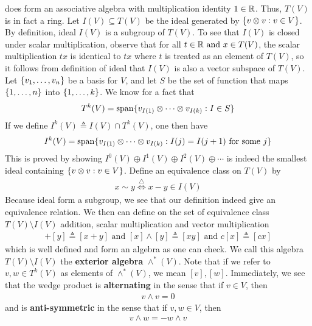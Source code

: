 \documentclass{report}
\begin{document}
\begin{mdframed}
does form an associative algebra with multiplication identity $1\in\mathbb{R}$. Thus, $T(V)$ is in fact a ring. Let $I(V)\subseteq T(V)$ be the ideal generated by $\{ v\otimes v:v \in V \}$. By definition, ideal $I(V)$ is a subgroup of $T(V)$. To see that $I(V)$ is closed under scalar multiplication, observe that for all $t\in\mathbb{R}\text{ and }x\in T(V)$, the scalar multiplication $tx$ is identical to $tx$ where $t$ is treated as an element of $T(V)$, so it follows from definition of ideal that $I(V)$ is also a vector subspace of $T(V)$. Let $\{ v_1,\dots ,v_n \}$ be a basis for $V$, and let  $S$ be the set of function that maps  $\{ 1,\dots ,n \}$ into $\{ 1,\dots ,k \}$. We know for a fact that 
\begin{align*}
T^k(V) = \operatorname{span} \{ v_{I(1)}\otimes  \cdots \otimes  v_{I(k)}: I \in S \}
\end{align*}
If we define $I^k(V)\triangleq I(V)\cap T^k(V)$, one then have 
\begin{align}
\label{ikv} I^k(V)=\operatorname{span}\{ v_{I(1)}\otimes \cdots \otimes  v_{I(k)}:I(j)=I(j+1)\text{ for some }j \}
\end{align}
This is proved by showing $I^0(V)\oplus  I^1(V)\oplus  I^2(V)\oplus  \cdots $ is indeed the smallest ideal containing $\{ v\otimes  v:v \in V \}$. Define an equivalence class on $T(V)$ by 
\begin{align*}
x\sim  y\overset{\triangle}{\iff }x-y \in I (V)
\end{align*}
Because ideal form a subgroup, we see that our definition indeed give an equivalence relation. We then can define on the set of equivalence class $T(V)\setminus I(V)$ addition, scalar multiplication and vector multiplication 
\begin{align*}
[x]+[y]\triangleq [x+y] \text{ and }[x]\wedge [y]\triangleq [xy]\text{ and }c[x]\triangleq [cx]
\end{align*}
which is well defined and form an algebra as one can check. We call this algebra $T(V)\setminus I(V)$ the \textbf{exterior algebra} $\wedge ^* (V)$. Note that if we refer to $v,w \in T^k(V)$ as elements of $\wedge ^*(V) $, we mean $[v],[w]$. Immediately, we see that the wedge product is \textbf{alternating} in the sense that if $v\in V$, then 
\begin{align*}
v\wedge v=0 
\end{align*}
and is \textbf{anti-symmetric} in the sense that if $v,w \in V$, then 
\begin{align*}
v\wedge w= -w\wedge  v
\end{align*}

\end{mdframed}
\end{document}

